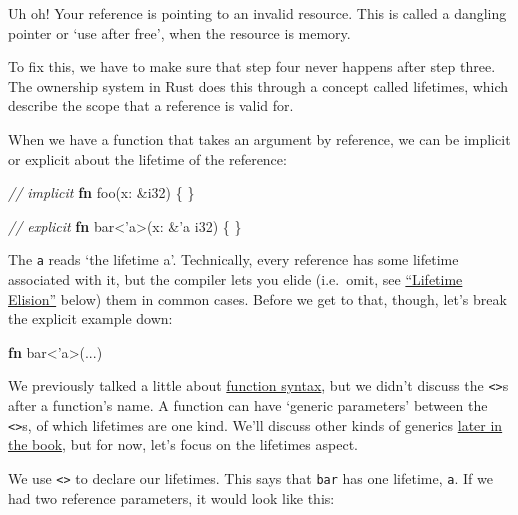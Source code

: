 \documentclass[a4paper,]{book}
\newenvironment{Shaded}{\begin{snugshade}}{\end{snugshade}}
\newcommand{\KeywordTok}[1]{\textcolor[rgb]{0.13,0.29,0.53}{\textbf{{#1}}}}
\newcommand{\DataTypeTok}[1]{\textcolor[rgb]{0.13,0.29,0.53}{{#1}}}
\newcommand{\CommentTok}[1]{\textcolor[rgb]{0.56,0.35,0.01}{\textit{{#1}}}}
\newcommand{\OtherTok}[1]{\textcolor[rgb]{0.56,0.35,0.01}{{#1}}}
\newcommand{\NormalTok}[1]{{#1}}
\begin{document}
Uh oh! Your reference is pointing to an invalid resource. This is called
a dangling pointer or `use after free', when the resource is memory.

To fix this, we have to make sure that step four never happens after
step three. The ownership system in Rust does this through a concept
called lifetimes, which describe the scope that a reference is valid
for.

When we have a function that takes an argument by reference, we can be
implicit or explicit about the lifetime of the reference:

\begin{Shaded}
\begin{Highlighting}[]
\CommentTok{// implicit}
\KeywordTok{fn} \NormalTok{foo(x: &}\DataTypeTok{i32}\NormalTok{) \{}
\NormalTok{\}}

\CommentTok{// explicit}
\KeywordTok{fn} \NormalTok{bar<}\OtherTok{'a}\NormalTok{>(x: &}\OtherTok{'a} \DataTypeTok{i32}\NormalTok{) \{}
\NormalTok{\}}
\end{Highlighting}
\end{Shaded}

The \texttt{\textquotesingle{}a} reads `the lifetime a'. Technically,
every reference has some lifetime associated with it, but the compiler
lets you elide (i.e.~omit, see
\protect\hyperlink{lifetime-elision}{``Lifetime Elision''} below) them
in common cases. Before we get to that, though, let's break the explicit
example down:

\begin{Shaded}
\begin{Highlighting}[]
\KeywordTok{fn} \NormalTok{bar<}\OtherTok{'a}\NormalTok{>(...)}
\end{Highlighting}
\end{Shaded}

We previously talked a little about
\protect\hyperlink{sec--functions}{function syntax}, but we didn't
discuss the \texttt{\textless{}\textgreater{}}s after a function's name.
A function can have `generic parameters' between the
\texttt{\textless{}\textgreater{}}s, of which lifetimes are one kind.
We'll discuss other kinds of generics
\protect\hyperlink{sec--generics}{later in the book}, but for now, let's
focus on the lifetimes aspect.

We use \texttt{\textless{}\textgreater{}} to declare our lifetimes. This
says that \texttt{bar} has one lifetime, \texttt{\textquotesingle{}a}.
If we had two reference parameters, it would look like this:
\end{document}
